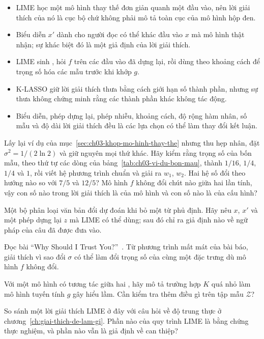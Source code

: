 \begin{tomtat}
\begin{itemize}
  \item LIME học một mô hình thay thế đơn giản quanh một đầu vào, nên lời giải
  thích của nó là cục bộ chứ không phải mô tả toàn cục của mô hình hộp đen.
  \item Biểu diễn $x'$ dành cho người đọc có thể khác đầu vào $x$ mà mô hình
  thật nhận; sự khác biệt đó là một giả định của lời giải thích.
  \item LIME sinh , hỏi $f$ trên các đầu vào đã dựng lại, rồi dùng
   theo khoảng cách để trọng số hóa các mẫu trước khi
  khớp $g$.
  \item K-LASSO giữ lời giải thích thưa bằng cách giới hạn số thành phần, nhưng
  sự thưa không chứng minh rằng các thành phần khác không tác động.
  \item Biểu diễn, phép dựng lại, phép nhiễu, khoảng cách, độ rộng hàm nhân,
  số mẫu và độ dài lời giải thích đều là các lựa chọn có thể làm thay đổi kết
  luận.
\end{itemize}
\end{tomtat}

\cauhoi
\begin{cauhoids}
  \item Lấy lại ví dụ của mục~\ref{sec:ch03-khop-mo-hinh-thay-the} nhưng thu hẹp
  nhân, đặt $\sigma^2 = 1/(2\ln 2)$ và giữ nguyên mọi thứ khác. Hãy kiểm rằng
  trọng số của bốn mẫu, theo thứ tự các dòng của bảng~\ref{tab:ch03-vi-du-bon-mau},
  thành $1/16$, $1/4$, $1/4$ và $1$, rồi viết hệ phương
  trình chuẩn và giải ra $w_1$, $w_2$. Hai hệ số đổi theo hướng nào so với
  $7/5$ và $12/5$? Mô hình $f$ không đổi chút nào giữa hai lần tính, vậy con số
  nào trong lời giải thích là của mô hình và con số nào là của cấu hình?
  \item Một bộ phân loại văn bản đổi dự đoán khi bỏ một từ phủ định. Hãy nêu
  $x$, $x'$ và một phép dựng lại $z$ mà LIME có thể dùng; sau đó chỉ ra giả
  định nào về ngữ pháp của câu đã được đưa vào.
  \item Đọc bài \enquote{Why Should I Trust You?}~\autocite{p09lime}. Từ
  phương trình mất mát của bài báo, giải thích vì sao đổi $\sigma$ có thể làm
  đổi trọng số của cùng một đặc trưng dù mô hình $f$ không đổi.
  \item Với một mô hình có tương tác giữa hai , hãy mô tả trường hợp
  $K$ quá nhỏ làm mô hình tuyến tính $g$ gây hiểu lầm. Cần kiểm tra thêm điều
  gì trên tập mẫu $\mathcal{Z}$?
  \item So sánh một lời giải thích LIME ở đây với câu hỏi về độ trung thực ở
  chương~\ref{ch:giai-thich-de-lam-gi}. Phần nào của quy trình LIME là bằng
  chứng thực nghiệm, và phần nào vẫn là giả định về can thiệp?
\end{cauhoids}
